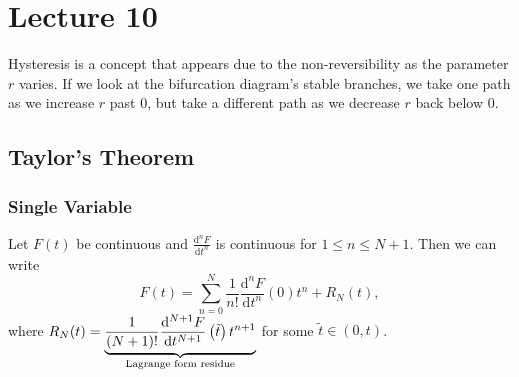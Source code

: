 \documentclass[class=article, crop=false]{standalone}
\begin{document}
  \section{Lecture 10}
  \begin{note}{}
    Hysteresis is a concept that appears due to the non-reversibility as the parameter $r$ varies. If we look at the bifurcation diagram's stable branches, we take one path as we increase $r$ past 0, but take a different path as we decrease $r$ back below 0.
  \end{note}
  \subsection{Taylor's Theorem}
  \subsubsection{Single Variable}
  Let $F(t)$ be continuous and $\displaystyle \frac{\mathrm{d}^nF}{\mathrm{d}t^n}$ is continuous for $1 \leq n \leq N + 1$. Then we can write
  \[
    F(t) = \sum_{n=0}^{N} \frac{1}{n!} \frac{\mathrm{d}^nF}{\mathrm{d}t^n}(0)t^n + R_N(t),
  \]
  where $\displaystyle R_N(t) = \underbrace{\frac{1}{(N + 1)!} \frac{\mathrm{d}^{N + 1}F}{\mathrm{d}t^{N + 1}}\left( \tilde t \right)t^{n + 1}}_{\text{Lagrange form residue}}$ for some $\tilde t\in (0, t)$.
\end{document}
